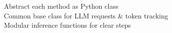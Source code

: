 \documentclass[preview]{standalone}
\begin{document}
Abstract each method as Python class\\Common base class for LLM requests & token tracking\\Modular inference functions for clear steps\\
\end{document}
